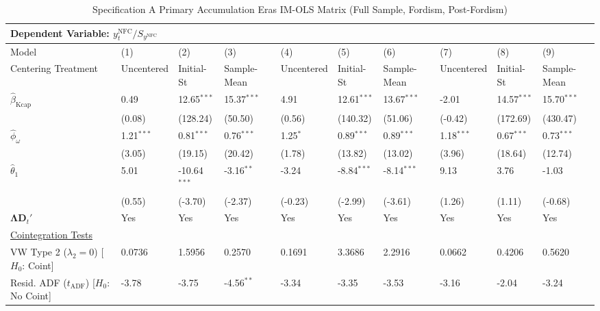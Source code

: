 \begin{landscape}
\begin{table}[H]
\centering
\caption{Specification A Primary Accumulation Eras IM-OLS Matrix (Full Sample, Fordism, Post-Fordism)}
\label{tab:specA_primary}
\small
\begin{tabular}{p{4.8cm}p{1.8cm}p{1.8cm}p{1.8cm}p{1.8cm}p{1.8cm}p{1.8cm}p{1.8cm}p{1.8cm}p{1.8cm}}
\toprule
\multicolumn{10}{l}{\textbf{Dependent Variable: $y_t^{\text{NFC}} / S_{y^{\text{NFC}}}$}} \\
\midrule
Model & (1) & (2) & (3) & (4) & (5) & (6) & (7) & (8) & (9)  \\
Centering Treatment & Uncentered & Initial-St & Sample-Mean & Uncentered & Initial-St & Sample-Mean & Uncentered & Initial-St & Sample-Mean  \\
\midrule
$\hat{\beta}_{\text{Kcap}}$ & 0.49 & 12.65$^{***}$ & 15.37$^{***}$ & 4.91 & 12.61$^{***}$ & 13.67$^{***}$ & -2.01 & 14.57$^{***}$ & 15.70$^{***}$  \\
 & {\scriptsize (0.08)} & {\scriptsize (128.24)} & {\scriptsize (50.50)} & {\scriptsize (0.56)} & {\scriptsize (140.32)} & {\scriptsize (51.06)} & {\scriptsize (-0.42)} & {\scriptsize (172.69)} & {\scriptsize (430.47)}  \\
$\hat{\phi}_{\omega}$ & 1.21$^{***}$ & 0.81$^{***}$ & 0.76$^{***}$ & 1.25$^{*}$ & 0.89$^{***}$ & 0.89$^{***}$ & 1.18$^{***}$ & 0.67$^{***}$ & 0.73$^{***}$  \\
 & {\scriptsize (3.05)} & {\scriptsize (19.15)} & {\scriptsize (20.42)} & {\scriptsize (1.78)} & {\scriptsize (13.82)} & {\scriptsize (13.02)} & {\scriptsize (3.96)} & {\scriptsize (18.64)} & {\scriptsize (12.74)}  \\
$\hat{\theta}_{1}$ & 5.01 & -10.64$^{***}$ & -3.16$^{**}$ & -3.24 & -8.84$^{***}$ & -8.14$^{***}$ & 9.13 & 3.76 & -1.03  \\
 & {\scriptsize (0.55)} & {\scriptsize (-3.70)} & {\scriptsize (-2.37)} & {\scriptsize (-0.23)} & {\scriptsize (-2.99)} & {\scriptsize (-3.61)} & {\scriptsize (1.26)} & {\scriptsize (1.11)} & {\scriptsize (-0.68)}  \\
$\boldsymbol{\Lambda} \mathbf{D}_t'$ & Yes & Yes & Yes & Yes & Yes & Yes & Yes & Yes & Yes  \\
\midrule
\multicolumn{10}{l}{\underline{Cointegration Tests}} \\
VW Type 2 ($\lambda_2 = 0$) [$H_0$: Coint] & 0.0736 & 1.5956 & 0.2570 & 0.1691 & 3.3686 & 2.2916 & 0.0662 & 0.4206 & 0.5620  \\
Resid. ADF ($t_{\text{ADF}}$) [$H_0$: No Coint] & -3.78 & -3.75 & -4.56$^{**}$ & -3.34 & -3.35 & -3.53 & -3.16 & -2.04 & -3.24  \\

\end{tabular}
\end{table}
\end{landscape}
